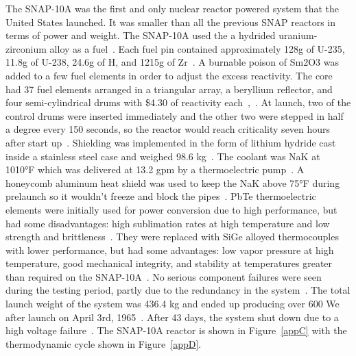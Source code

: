 \documentclass{article}
\begin{document}
    The SNAP-10A was the first and only nuclear reactor powered system that the United States launched. It was smaller than all the previous SNAP reactors in terms of power and weight. The SNAP-10A used the a hydrided uranium-zirconium alloy as a fuel~\cite{lords1994snap}.  Each fuel pin contained approximately 128g of U-235, 11.8g of U-238, 24.6g of H, and 1215g of Zr~\cite{voss1984snap}. A burnable poison of Sm2O3 was added to a few fuel elements in order to adjust the excess reactivity. The core had 37 fuel elements arranged in a triangular array, a beryllium reflector, and four semi-cylindrical drums with \$4.30 of reactivity each~\cite{voss1984snap},~\cite{ohlenkamp1966snap}. At launch, two of the control drums were inserted immediately and the other two were stepped in half a degree every 150 seconds, so the reactor would reach criticality seven hours after start up~\cite{voss1984snap}. Shielding was implemented in the form of lithium hydride cast inside a stainless steel case and weighed 98.6 kg~\cite{ohlenkamp1966snap}. The coolant was NaK at 1010°F which was delivered at 13.2 gpm by a thermoelectric pump~\cite{ohlenkamp1966snap}. A honeycomb aluminum heat shield was used to keep the NaK above 75°F during prelaunch so it wouldn't freeze and block the pipes~\cite{ohlenkamp1966snap}. PbTe thermoelectric elements were initially used for power conversion due to high performance, but had some disadvantages: high sublimation rates at high temperature and low strength and brittleness~\cite{voss1984snap}. They were replaced with SiGe alloyed thermocouples with lower performance, but had some advantages: low vapor pressure at high temperature, good mechanical integrity, and stability at temperatures greater than required on the SNAP-10A~\cite{voss1984snap}. No serious component failures were seen during the testing period, partly due to the redundancy in the system~\cite{ohlenkamp1966snap}. The total launch weight of the system was 436.4 kg and ended up producing over 600 We after launch on April 3rd, 1965~\cite{websnap}. After 43 days, the system shut down due to a high voltage failure~\cite{websnap}. The SNAP-10A reactor is shown in Figure~\ref{appC} with the thermodynamic cycle shown in Figure~\ref{appD}. 
\end{document}
